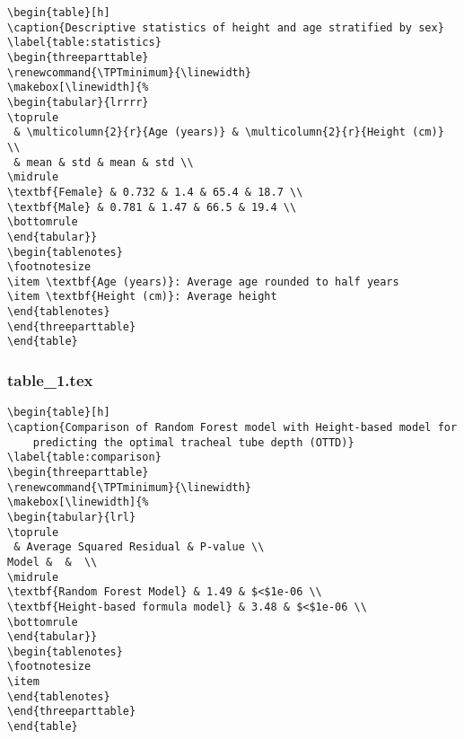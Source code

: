 \documentclass[11pt]{article}
\begin{document}
\begin{Verbatim}[tabsize=4]
\begin{table}[h]
\caption{Descriptive statistics of height and age stratified by sex}
\label{table:statistics}
\begin{threeparttable}
\renewcommand{\TPTminimum}{\linewidth}
\makebox[\linewidth]{%
\begin{tabular}{lrrrr}
\toprule
 & \multicolumn{2}{r}{Age (years)} & \multicolumn{2}{r}{Height (cm)} \\
 & mean & std & mean & std \\
\midrule
\textbf{Female} & 0.732 & 1.4 & 65.4 & 18.7 \\
\textbf{Male} & 0.781 & 1.47 & 66.5 & 19.4 \\
\bottomrule
\end{tabular}}
\begin{tablenotes}
\footnotesize
\item \textbf{Age (years)}: Average age rounded to half years
\item \textbf{Height (cm)}: Average height
\end{tablenotes}
\end{threeparttable}
\end{table}

\end{Verbatim}

\subsubsection*{table\_1.tex}

\begin{Verbatim}[tabsize=4]
\begin{table}[h]
\caption{Comparison of Random Forest model with Height-based model for
	predicting the optimal tracheal tube depth (OTTD)}
\label{table:comparison}
\begin{threeparttable}
\renewcommand{\TPTminimum}{\linewidth}
\makebox[\linewidth]{%
\begin{tabular}{lrl}
\toprule
 & Average Squared Residual & P-value \\
Model &  &  \\
\midrule
\textbf{Random Forest Model} & 1.49 & $<$1e-06 \\
\textbf{Height-based formula model} & 3.48 & $<$1e-06 \\
\bottomrule
\end{tabular}}
\begin{tablenotes}
\footnotesize
\item
\end{tablenotes}
\end{threeparttable}
\end{table}

\end{Verbatim}
\end{document}
